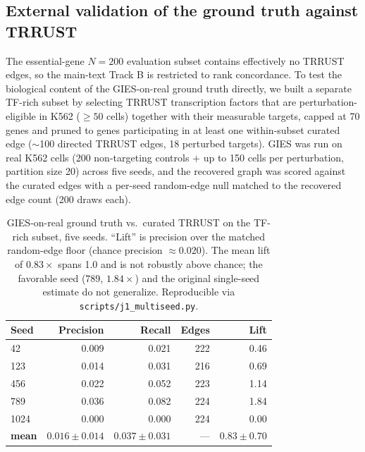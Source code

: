 \documentclass{article}
\theoremstyle{plain}
\theoremstyle{definition}
\theoremstyle{remark}
\begin{document}
\subsection{External validation of the ground truth against TRRUST}
\label{app:trrust}
The essential-gene $N{=}200$ evaluation subset contains effectively no TRRUST~\citep{han2018trrust} edges, so the main-text Track B is restricted to rank concordance. To test the biological content of the GIES-on-real ground truth directly, we built a separate TF-rich subset by selecting TRRUST transcription factors that are perturbation-eligible in K562 ($\geq 50$ cells) together with their measurable targets, capped at 70 genes and pruned to genes participating in at least one within-subset curated edge ($\sim$100 directed TRRUST edges, 18 perturbed targets). GIES was run on real K562 cells (200 non-targeting controls $+$ up to 150 cells per perturbation, partition size 20) across five seeds, and the recovered graph was scored against the curated edges with a per-seed random-edge null matched to the recovered edge count (200 draws each).

\begin{table}[h]
\centering
\small
\begin{tabular}{lrrrr}
\toprule
\textbf{Seed} & \textbf{Precision} & \textbf{Recall} & \textbf{Edges} & \textbf{Lift} \\
\midrule
42   & 0.009 & 0.021 & 222 & 0.46 \\
123  & 0.014 & 0.031 & 216 & 0.69 \\
456  & 0.022 & 0.052 & 223 & 1.14 \\
789  & 0.036 & 0.082 & 224 & 1.84 \\
1024 & 0.000 & 0.000 & 224 & 0.00 \\
\midrule
\textbf{mean} & $0.016 \pm 0.014$ & $0.037 \pm 0.031$ & --- & $\mathbf{0.83 \pm 0.70}$ \\
\bottomrule
\end{tabular}
\caption{GIES-on-real ground truth vs.\ curated TRRUST on the TF-rich subset, five seeds. ``Lift'' is precision over the matched random-edge floor (chance precision $\approx 0.020$). The mean lift of $0.83\times$ spans 1.0 and is not robustly above chance; the favorable seed (789, $1.84\times$) and the original single-seed estimate do not generalize. Reproducible via \texttt{scripts/j1\_multiseed.py}.}
\label{tab:trrust_multiseed}
\end{table}
\end{document}
